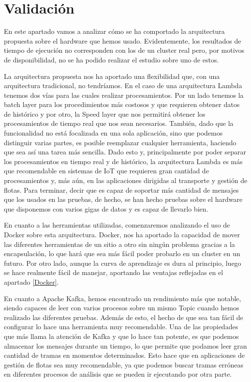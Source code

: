 
\chapter{Validación\label{validacion}}

En este apartado vamos a analizar cómo se ha comportado la arquitectura
propuesta sobre el hardware que hemos usado. Evidentemente, los resultados
de tiempo de ejecución no corresponden con los de un cluster real pero, por
motivos de disponibilidad, no se ha podido realizar el estudio sobre uno de
estos.

La arquitectura propuesta nos ha aportado una flexibilidad que, con una
arquitectura tradicional, no tendríamos. En el caso de una arquitectura
Lambda tenemos dos vías para las cuales realizar procesamientos. Por un
lado tenemos la batch layer para los procedimientos más costosos y que
requieren obtener datos de histórico y por otro, la Speed layer que nos
permitirá obtener los procesamientos de tiempo real que nos sean
necesarios. También, dado que la funcionalidad no está focalizada en una
sola aplicación, sino que podemos distinguir varias partes, es posible
reemplazar cualquier herramienta, haciendo que sea así una tarea más
sencilla. Dado esto y, principalmente por poder separar los procesamientos
en tiempo real y de histórico, la arquitectura Lambda es más que
recomendable en sistemas de IoT que requieren gran cantidad de
procesamientos y, más aún, en las aplicaciones dirigidas al transporte y
gestión de flotas. Para terminar, decir que es capaz de soportar más cantidad
de mensajes que los usados en las pruebas, de hecho, se han hecho pruebas
sobre el hardware que disponemos con varios gigas de datos y es capaz de
llevarlo bien.

En cuanto a las herramientas utilizadas, comenzaremos analizando el uso de
Docker sobre esta arquitectura. Docker, nos ha aportado la capacidad de
mover las diferentes herramientas de un sitio a otro sin ningún problema
gracias a la encapsulación, lo que hará que sea más fácil poder probarlo en
un cluster en un futuro. Por otro lado, aunque la curva de aprendizaje es
dura al principio, luego se hace realmente fácil de manejar, aportando las
ventajas reflejadas en el apartado \ref{Docker}.

En cuanto a Apache Kafka, hemos encontrado un rendimiento más que notable,
siendo capaces de leer con varios procesos sobre un mismo Topic cuando
hemos realizado las diferentes pruebas. Además de esto, el hecho de que sea
tan fácil de configurar lo hace una herramienta muy recomendable. Una de
las propiedades que más llama la atención de Kafka y que lo hace tan
potente, es que podemos almacenar los mensajes durante un tiempo, lo que
permite que podamos leer gran cantidad de tramas en momentos determinados.
Esto hace que en aplicaciones de gestión de flotas sea muy recomendable, ya
que podemos buscar tramas erróneas en diferentes procesos de análisis que
se pueden ir ejecutando por otra parte.

